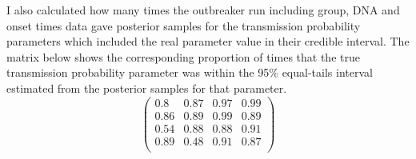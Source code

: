 \documentclass[11pt,a4paper]{report}
\begin{document}
I also calculated how many times the outbreaker run including group, DNA and onset times data gave posterior samples for the transmission probability parameters which included the real parameter value in their credible interval. The matrix below shows the corresponding proportion of times that the true transmission probability parameter was within the 95\% equal-tails interval estimated from the posterior samples for that parameter.
\begin{equation}
\begin{pmatrix}
0.8 & 0.87 & 0.97 & 0.99 \\
0.86 & 0.89 & 0.99 & 0.89 \\
0.54 & 0.88 & 0.88 & 0.91 \\
0.89 & 0.48 & 0.91 & 0.87 \\
\end{pmatrix}
\end{equation}
\end{document}
